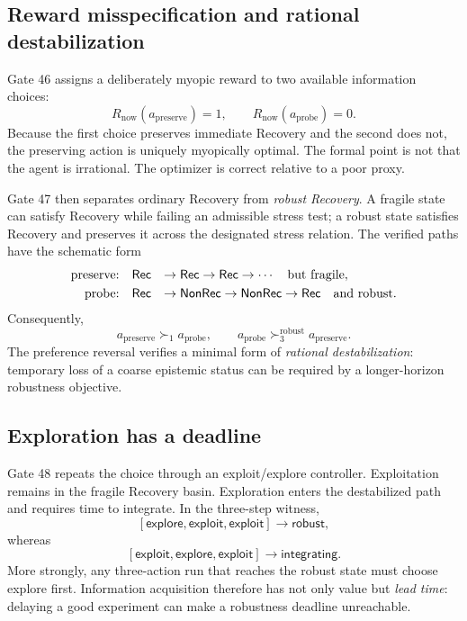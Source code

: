 \subsection{Reward misspecification and rational destabilization}

Gate 46 assigns a deliberately myopic reward to two available information choices:
\[
R_{\mathrm{now}}(a_{\mathrm{preserve}})=1,
\qquad
R_{\mathrm{now}}(a_{\mathrm{probe}})=0.
\]
Because the first choice preserves immediate Recovery and the second does not, the preserving action is uniquely myopically optimal. The formal point is not that the agent is irrational. The optimizer is correct relative to a poor proxy.

Gate 47 then separates ordinary Recovery from \emph{robust Recovery}. A fragile state can satisfy Recovery while failing an admissible stress test; a robust state satisfies Recovery and preserves it across the designated stress relation. The verified paths have the schematic form
\[
\begin{array}{rcl}
\text{preserve:}& \mathsf{Rec}&\to\mathsf{Rec}\to\mathsf{Rec}\to\cdots\quad\text{but fragile},\\[1mm]
\text{probe:}& \mathsf{Rec}&\to\mathsf{NonRec}\to\mathsf{NonRec}\to\mathsf{Rec}\quad\text{and robust}.
\end{array}
\]
Consequently,
\[
a_{\mathrm{preserve}}\succ_1 a_{\mathrm{probe}},
\qquad
 a_{\mathrm{probe}}\succ^{\mathrm{robust}}_3 a_{\mathrm{preserve}}.
\]
The preference reversal verifies a minimal form of \emph{rational destabilization}: temporary loss of a coarse epistemic status can be required by a longer-horizon robustness objective.

\subsection{Exploration has a deadline}

Gate 48 repeats the choice through an \textsf{exploit}/\textsf{explore} controller. Exploitation remains in the fragile Recovery basin. Exploration enters the destabilized path and requires time to integrate. In the three-step witness,
\[
[\textsf{explore},\textsf{exploit},\textsf{exploit}]
\longrightarrow \textsf{robust},
\]
whereas
\[
[\textsf{exploit},\textsf{explore},\textsf{exploit}]
\longrightarrow \textsf{integrating}.
\]
More strongly, any three-action run that reaches the robust state must choose \textsf{explore} first. Information acquisition therefore has not only value but \emph{lead time}: delaying a good experiment can make a robustness deadline unreachable.

